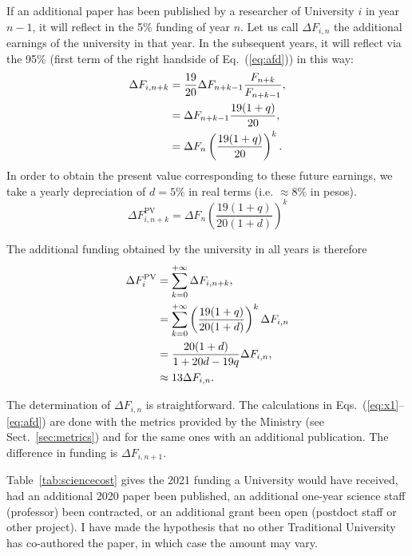 \documentclass[twocolumn]{article}
\def\eqref#1{Eq.~(\ref{eq:#1})}
\def\eqsref#1#2{Eqs.~(\ref{eq:#1}--\ref{eq:#2})}
\begin{document}
If an additional paper has been published by a researcher of University $i$ in year $n - 1$, it will reflect in the 5\% funding of year $n$. Let us call $\Delta F_{i,n}$ the additional earnings 
of the university in that year.  In the subsequent years, it will reflect via the 95\% 
(first term of the right handside of \eqref{afd}) in this way:
\begin{align}
   \Delta F_{i,n+k} &=  \frac{19}{20} \Delta F_{n+k-1} 
                                \frac{F_{n+k}}{F_{n+k-1}}, \notag\\
                    &= \Delta F_{n+k-1}  \frac{ 19 (1 + q)} { 20}\notag,\\
                    &= \Delta F_{n} \left(\frac{ 19(1+q)} {20} \right) ^{k}.
\end{align}
In order to obtain the present value  corresponding to these future earnings, we take a yearly depreciation of $d = 5$\% in real terms (i.e. $\approx 8\%$ in pesos).  
\begin{equation}
    \Delta F_{i,n+k}^\text{PV} = \Delta F_{n}    
                \left(\frac{ 19(1+q)} {20(1+d)} \right) ^{k}
\end{equation}

The additional funding obtained by the university in all years is therefore
\begin{align}
    \Delta F_{i}^\text{PV}
         &= \sum_{k=0}^{+\infty} \Delta F_{i,n+k}, \notag \\
         &= \sum_{k=0}^{+\infty} \left(
                        \frac{19(1 + q)}{20(1 + d)}  \right)^k\Delta F_{i,n} \notag \\
                 &= \frac{20(1+d)}{1 + 20d - 19q} \Delta F_{i,n}, \\
                 &\approx 13 \Delta F_{i,n}. \notag
\end{align}

The determination of $\Delta F_{i,n}$ is straightforward.  The calculations
in \eqsref{x1}{afd} are done with the metrics provided by the Ministry (see Sect.~\ref{sec:metrics}) and for the same ones with an additional publication.  The difference in funding is $\Delta F_{i,n+1}$. 

Table~\ref{tab:sciencecost} gives the 2021 funding a University would have received, had an additional 2020 paper been published, an additional one-year science staff (professor) been contracted, or an additional grant been open (postdoct staff or other project).  I have made the hypothesis that no other Traditional University has co-authored the paper, in which case the amount may vary. 
\end{document}
